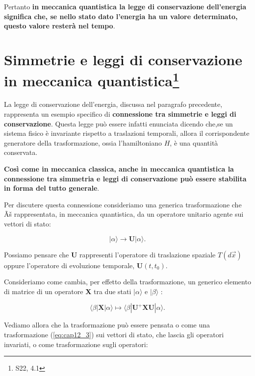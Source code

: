 Pertanto \textbf{in meccanica quantistica la legge di conservazione dell'energia significa che, se nello stato dato l'energia ha un valore determinato, questo valore resterà nel tempo}.

\section[Simmetrie e leggi di conservazione  in meccanica quantistica]{Simmetrie e leggi di conservazione  in meccanica quantistica\footnote{S22, 4.1 }} 

La legge di conservazione dell'energia, discussa nel paragrafo precedente, rappresenta un esempio specifico di \textbf{connessione tra simmetrie e leggi di conservazione}. Questa legge può essere infatti enunciata dicendo che,se un sistema fisico è invariante rispetto a traslazioni temporali, allora il corrispondente generatore della trasformazione, ossia l'hamiltoniano $H$, è una quantità conservata.

\textbf{Così come in meccanica classica, anche in meccanica quantistica la connessione tra simmetria e leggi di conservazione può essere stabilita in forma del tutto generale}.

Per discutere questa connessione consideriamo una generica trasformazione che Ãš rappresentata, in meccanica quantistica, da un operatore unitario agente sui vettori di stato:

\begin{equation}\label{eq:cap12_3}
|\alpha \rangle \rightarrow\textbf{U}|\alpha \rangle.
\end{equation}

Possiamo pensare che $\textbf{U}$ rappresenti l'operatore di traslazione spaziale $T(d\vec{x})$ oppure l'operatore di evoluzione temporale, $\textbf{U}(t,t_0)$.

Consideriamo come cambia, per effetto della trasformazione, un generico elemento di matrice di un operatore \textbf{X} tra due stati $|\alpha \rangle$ e $|\beta\rangle$ :

\begin{equation}
\langle \beta|\textbf{X}|\alpha \rangle   \mapsto    \langle \beta |\textbf{U}^+\textbf{X}\textbf{U}|\alpha \rangle.
\end{equation}

Vediamo allora che la trasformazione può essere pensata o come una trasformazione (\ref{eq:cap12_3})  sui vettori di stato, che lascia gli operatori invariati, o come trasformazione sugli operatori:

